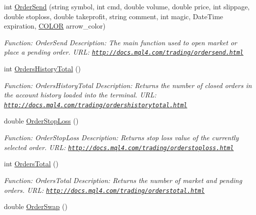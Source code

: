 \begin{DoxyCompactItemize}
int \hyperlink{class_m_q_l4_c_sharp_1_1_base_1_1_m_q_l_base_aa62018f212f7995c0ff809dda38fb15e}{Order\+Send} (string symbol, int cmd, double volume, double price, int slippage, double stoploss, double takeprofit, string comment, int magic, Date\+Time expiration, \hyperlink{namespace_m_q_l4_c_sharp_1_1_base_1_1_enums_a79b99235c71c70f2f5207aac2ff24f1a}{C\+O\+L\+OR} arrow\+\_\+color)
\begin{DoxyCompactList}\small\item\em Function\+: Order\+Send Description\+: The main function used to open market or place a pending order. U\+RL\+: \href{http://docs.mql4.com/trading/ordersend.html}{\tt http\+://docs.\+mql4.\+com/trading/ordersend.\+html} \end{DoxyCompactList}\item 
int \hyperlink{class_m_q_l4_c_sharp_1_1_base_1_1_m_q_l_base_a46ebfe6b08f0b89cd7729eb0376fac2f}{Orders\+History\+Total} ()
\begin{DoxyCompactList}\small\item\em Function\+: Orders\+History\+Total Description\+: Returns the number of closed orders in the account history loaded into the terminal. U\+RL\+: \href{http://docs.mql4.com/trading/ordershistorytotal.html}{\tt http\+://docs.\+mql4.\+com/trading/ordershistorytotal.\+html} \end{DoxyCompactList}\item 
double \hyperlink{class_m_q_l4_c_sharp_1_1_base_1_1_m_q_l_base_ae351f7566b163a828e1961e79a73af35}{Order\+Stop\+Loss} ()
\begin{DoxyCompactList}\small\item\em Function\+: Order\+Stop\+Loss Description\+: Returns stop loss value of the currently selected order. U\+RL\+: \href{http://docs.mql4.com/trading/orderstoploss.html}{\tt http\+://docs.\+mql4.\+com/trading/orderstoploss.\+html} \end{DoxyCompactList}\item 
int \hyperlink{class_m_q_l4_c_sharp_1_1_base_1_1_m_q_l_base_a8ea6861ba4979ac529f9b959a5163eff}{Orders\+Total} ()
\begin{DoxyCompactList}\small\item\em Function\+: Orders\+Total Description\+: Returns the number of market and pending orders. U\+RL\+: \href{http://docs.mql4.com/trading/orderstotal.html}{\tt http\+://docs.\+mql4.\+com/trading/orderstotal.\+html} \end{DoxyCompactList}\item 
double \hyperlink{class_m_q_l4_c_sharp_1_1_base_1_1_m_q_l_base_a7d59e0d691282ea3717daac8b424a6d6}{Order\+Swap} ()

\end{DoxyCompactItemize}
